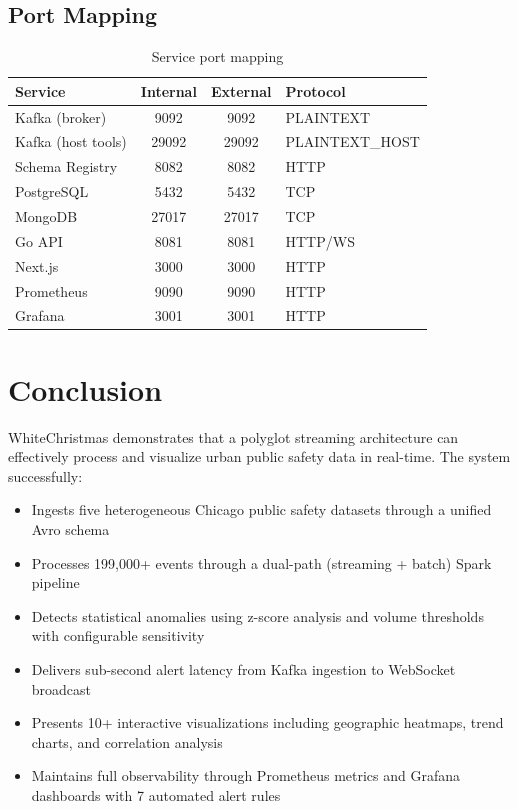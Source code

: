 \documentclass[12pt,a4paper]{article}
\begin{document}
\subsection{Port Mapping}

\begin{table}[H]
\centering
\caption{Service port mapping}
\begin{tabular}{l c c l}
\toprule
\textbf{Service} & \textbf{Internal} & \textbf{External} & \textbf{Protocol} \\
\midrule
Kafka (broker) & 9092 & 9092 & PLAINTEXT \\
Kafka (host tools) & 29092 & 29092 & PLAINTEXT\_HOST \\
Schema Registry & 8082 & 8082 & HTTP \\
PostgreSQL & 5432 & 5432 & TCP \\
MongoDB & 27017 & 27017 & TCP \\
Go API & 8081 & 8081 & HTTP/WS \\
Next.js & 3000 & 3000 & HTTP \\
Prometheus & 9090 & 9090 & HTTP \\
Grafana & 3001 & 3001 & HTTP \\
\bottomrule
\end{tabular}
\end{table}

\section{Conclusion}

WhiteChristmas demonstrates that a polyglot streaming architecture can effectively process and visualize urban public safety data in real-time. The system successfully:

\begin{itemize}
  \item Ingests five heterogeneous Chicago public safety datasets through a unified Avro schema
  \item Processes 199,000+ events through a dual-path (streaming + batch) Spark pipeline
  \item Detects statistical anomalies using z-score analysis and volume thresholds with configurable sensitivity
  \item Delivers sub-second alert latency from Kafka ingestion to WebSocket broadcast
  \item Presents 10+ interactive visualizations including geographic heatmaps, trend charts, and correlation analysis
  \item Maintains full observability through Prometheus metrics and Grafana dashboards with 7 automated alert rules
\end{itemize}
\end{document}
